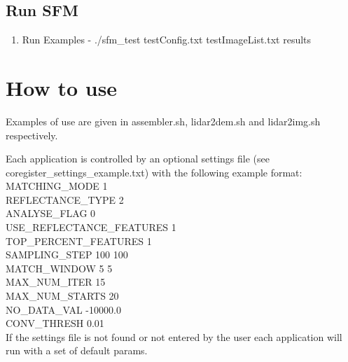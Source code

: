 \documentclass[12pt]{article}
\begin{document}
\subsection{Run SFM}
\begin{enumerate}
	\item{Run Examples} - ./sfm\_test testConfig.txt testImageList.txt results
\end{enumerate}

\section{How to use}
Examples of use are given in assembler.sh, lidar2dem.sh and lidar2img.sh respectively.

Each application is controlled by an optional settings file (see coregister\_settings\_example.txt) with the following example format:\\
MATCHING\_MODE 1\\
REFLECTANCE\_TYPE 2\\
ANALYSE\_FLAG 0\\
USE\_REFLECTANCE\_FEATURES 1\\
TOP\_PERCENT\_FEATURES 1\\
SAMPLING\_STEP 100 100\\
MATCH\_WINDOW 5 5\\
MAX\_NUM\_ITER 15\\
MAX\_NUM\_STARTS 20\\
NO\_DATA\_VAL -10000.0\\
CONV\_THRESH 0.01\\

If the settings file is not found or not entered by the user each application will run with a set of default params.
\end{document}
